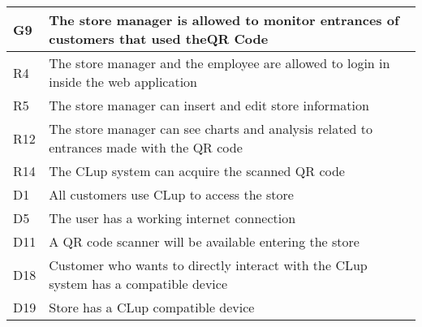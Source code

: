 \begin{center}
    {\renewcommand{\arraystretch}{1.5}
    \begin{longtable}{L{2cm}L{12cm}}
        \hline
        \textbf{G9} & \textbf{The store manager is allowed to monitor entrances of customers that used theQR Code} \\
        \hline
         R4 & The store manager and the employee are allowed to login in inside the web application \\
        \hline
         R5 & The store manager can insert and edit store information \\
        \hline
         R12 & The store manager can see charts and analysis related to entrances made with the QR code \\
        \hline
         R14 & The CLup system can acquire the scanned QR code \\
        \hline
         D1 & All customers use CLup to access the store \\
        \hline
         D5 & The user has a working internet connection \\
        \hline
         D11 & A QR code scanner will be available entering the store \\
        \hline
         D18 & Customer who wants to directly interact with the CLup system has a compatible device \\
        \hline
         D19 & Store has a CLup compatible device \\
        \hline
    \end{longtable}}


\end{center}
